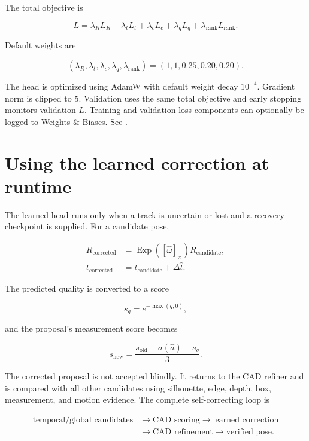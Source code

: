 \documentclass[11pt]{article}
\newcommand{\Exp}{\operatorname{Exp}}
\begin{document}
The total objective is

\begin{equation}
\boxed{
L=\lambda_RL_R+\lambda_tL_t+\lambda_cL_c
+\lambda_qL_q+\lambda_{\mathrm{rank}}L_{\mathrm{rank}}
}.
\end{equation}

Default weights are

\begin{equation}
(\lambda_R,\lambda_t,\lambda_c,\lambda_q,\lambda_{\mathrm{rank}})
=(1,1,0.25,0.20,0.20).
\end{equation}

The head is optimized using AdamW with default weight decay $10^{-4}$.
Gradient norm is clipped to 5. Validation uses the same total objective and
early stopping monitors validation $L$. Training and validation loss
components can optionally be logged to Weights \& Biases. See
.

\section{Using the learned correction at runtime}

The learned head runs only when a track is uncertain or lost and a recovery
checkpoint is supplied. For a candidate pose,

\begin{align}
R_{\mathrm{corrected}}
&=\Exp([\widehat\omega]_\times)R_{\mathrm{candidate}},\\
t_{\mathrm{corrected}}
&=t_{\mathrm{candidate}}+\Delta\widehat t.
\end{align}

The predicted quality is converted to a score

\begin{equation}
s_q=e^{-\max(\widehat q,0)},
\end{equation}

and the proposal's measurement score becomes

\begin{equation}
s_{\mathrm{new}}=
\frac{s_{\mathrm{old}}+\sigma(\widehat a)+s_q}{3}.
\end{equation}

The corrected proposal is not accepted blindly. It returns to the CAD refiner
and is compared with all other candidates using silhouette, edge, depth, box,
measurement, and motion evidence. The complete self-correcting loop is

\begin{align*}
\text{temporal/global candidates}
&\rightarrow\text{CAD scoring}
\rightarrow\text{learned correction}\\
&\rightarrow\text{CAD refinement}
\rightarrow\text{verified pose}.
\end{align*}
\end{document}
